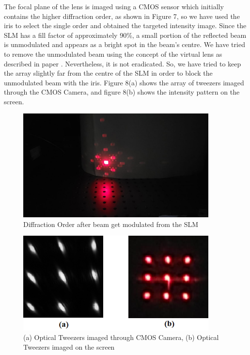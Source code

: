 The focal plane of the lens is imaged using a CMOS sensor which initially contains the higher diffraction order, as shown in Figure 7, so we have used the iris to select the single order and obtained the targeted intensity image. Since the SLM has a fill factor of approximately 90\%, a small portion of the reflected beam is unmodulated and appears as a bright spot in the beam's centre. We have tried to remove the unmodulated beam using the concept of the virtual lens as described in paper \cite{10.3389/fphy.2021.587112}. Nevertheless, it is not eradicated. So, we have tried to keep the array slightly far from the centre of the SLM in order to block the unmodulated beam with the iris. Figure 8(a) shows the array of tweezers imaged through the CMOS Camera, and figure 8(b) shows the intensity pattern on the screen. 

\begin{figure}[H]
\label{diff_order}
\centering
\includegraphics[width=0.9\textwidth]{img/diff.jpeg}
\caption{Diffraction Order after beam get modulated from the SLM}
\end{figure}

\vspace{1 cm}

\begin{figure}[H]
\label{img: result}
\centering
\includegraphics[width=0.9\textwidth]{img/result_img.png}
\caption{(a) Optical Tweezers imaged through CMOS Camera, (b) Optical Tweezers imaged on the screen}
\end{figure}

